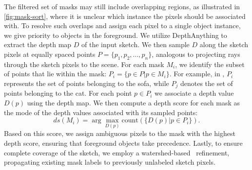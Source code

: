 The filtered set of masks may still include overlapping regions, as illustrated in \cref{fig:mask-sort}, where it is unclear which instance the pixels should be associated with. To resolve such overlaps and assign each pixel to a single object instance, we give priority to objects in the foreground.
We utilize DepthAnything \cite{depthanything} to extract the depth map $D$ of the input sketch. We then sample $D$ along the sketch pixels at equally spaced points $P=\{p_1,p_2,\dots ,p_n\}$, analogous to projecting rays through the sketch pixels to the scene. For each mask $M_i$, we identify the subset of points that lie within the mask: $P_i = \{p \in P | p\in M_i\}$. For example, in , $P_i$ represents the set of points belonging to the sofa, while $P_j$ denotes the set of points belonging to the cat. For each point $p \in P_i$ we associate a depth value $D(p)$ using the depth map. We then compute a depth score for each mask as the mode of the depth values associated with its sampled points:
\begin{equation}
    ds(M_i) = \arg \max_{D(p)} \text{count}(\{D(p)| p \in P_i\}).
\end{equation}
Based on this score, we assign ambiguous pixels to the mask with the highest depth score, ensuring that foreground objects take precedence. 
Lastly, to ensure complete coverage of the sketch, we employ a watershed-based~\cite{watershed1991} refinement, propagating existing mask labels to previously unlabeled sketch pixels.


